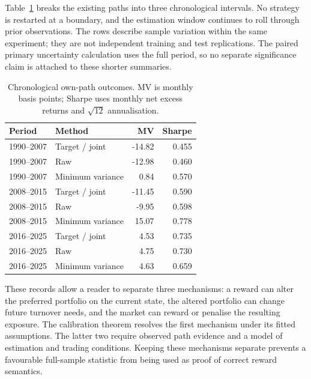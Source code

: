 Table~\ref{tab:periods} breaks the existing paths into three chronological intervals. No strategy is restarted at a boundary, and the estimation window continues to roll through prior observations. The rows describe sample variation within the same experiment; they are not independent training and test replications. The paired primary uncertainty calculation uses the full period, so no separate significance claim is attached to these shorter summaries.
\begin{table}[ht]
\centering\small
\caption{Chronological own-path outcomes. MV is monthly basis points; Sharpe uses monthly net excess returns and $\sqrt{12}$ annualisation.}
\label{tab:periods}
\begin{tabular}{llrr}\toprule
Period & Method & MV & Sharpe\\\midrule
1990--2007 & Target / joint & -14.82 & 0.455 \\
1990--2007 & Raw & -12.98 & 0.460 \\
1990--2007 & Minimum variance & 0.84 & 0.570 \\
2008--2015 & Target / joint & -11.45 & 0.590 \\
2008--2015 & Raw & -9.95 & 0.598 \\
2008--2015 & Minimum variance & 15.07 & 0.778 \\
2016--2025 & Target / joint & 4.53 & 0.735 \\
2016--2025 & Raw & 4.75 & 0.730 \\
2016--2025 & Minimum variance & 4.63 & 0.659 \\
\bottomrule\end{tabular}
\end{table}
These records allow a reader to separate three mechanisms: a reward can alter the preferred portfolio on the current state, the altered portfolio can change future turnover needs, and the market can reward or penalise the resulting exposure. The calibration theorem resolves the first mechanism under its fitted assumptions. The latter two require observed path evidence and a model of estimation and trading conditions. Keeping these mechanisms separate prevents a favourable full-sample statistic from being used as proof of correct reward semantics.
